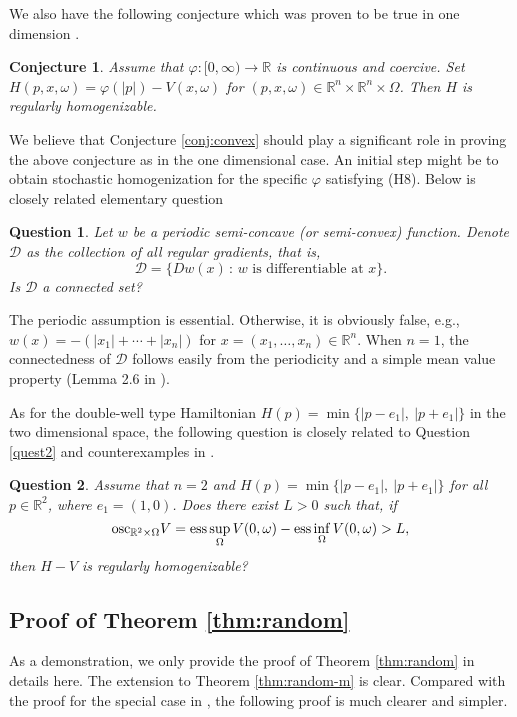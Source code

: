 \documentclass[12pt,reqno]{amsart}
\theoremstyle{plain}
\newtheorem{quest}{Question}
\newtheorem{conj}{Conjecture}
\theoremstyle{remark}
\numberwithin{equation}{section}
\newcommand{\R}{\mathbb{R}}
\newcommand{\om}{\omega}
\newcommand{\Om}{\Omega}
\begin{document}
We also have the following conjecture which was proven to be true in one dimension \cite{ATY2}. 

\begin{conj}  \label{conj:ran}
Assume that $\varphi:[0, \infty)\to \R$ is continuous and coercive.  
 Set $H(p,x,\om)=\varphi(|p|)-V(x,\om)$ for $(p,x,\om) \in \R^n \times \R^n \times \Om$. Then $H$ is regularly homogenizable. 
\end{conj}

We believe that  Conjecture \ref{conj:convex}  should play a significant role in proving the above conjecture as in the one dimensional case.  An initial step might be to obtain stochastic homogenization for  the specific $\varphi$ satisfying (H8). Below is closely related elementary question

\begin{quest}\label{quest3}
Let $w$ be a periodic semi-concave (or semi-convex) function.  Denote $\mathcal {D}$ as the collection of all regular gradients, that is, 
$$
\mathcal {D}=\{Dw(x)\,:\,  \text{$w$ is differentiable at $x$}\}.
$$
Is $\mathcal {D}$ a connected set?
\end{quest}
The periodic assumption is essential.  Otherwise, it is obviously  false, e.g.,  $w(x)=-(|x_1|+\cdots +|x_n|)$ for $x=(x_1,\ldots,x_n)\in \R^n$.   When $n=1$,  the connectedness of $\mathcal {D}$  follows easily from the periodicity and a simple mean value property (Lemma 2.6 in \cite{ATY2}).  

As for the double-well type Hamiltonian $H(p)=\min\{|p-e_1|,  \ |p+e_1|\}$ in the two dimensional space,  
the following question is closely related to Question \ref{quest2} and counterexamples in  \cite{Zi,Fe-Sou}.


\begin{quest}\label{quest4}
Assume that $n=2$ and $H(p)=\min\{|p-e_1|,  \ |p+e_1|\}$ for all $p\in \R^2$, where $e_1=(1,0)$.
Does there  exist $L>0$ such that, if 
$$
{\rm osc}_{\R^2\times \Om}V={\rm ess}\sup_{\Omega}V(0,\omega)- {\rm ess}\inf_{\Omega}V(0,\omega)>L,
$$
then $H-V$ is regularly homogenizable?
\end{quest}

\subsection{Proof of Theorem \ref{thm:random}}
As a demonstration,  we only provide the proof of Theorem \ref{thm:random} in details here. 
The extension to Theorem \ref{thm:random-m} is clear.  Compared with the proof for the special case  in \cite{ATY1},  the following  proof is much clearer and simpler. 
\end{document}
